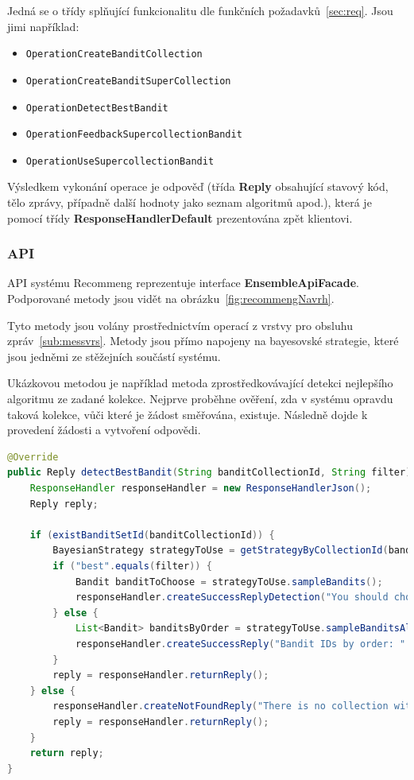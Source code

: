 \documentclass[thesis=M,czech]{FITthesis}[2014/05/07]
\begin{document}
Jedná se o třídy splňující funkcionalitu dle funkčních požadavků~\ref{sec:req}. Jsou jimi například:

\begin{itemize}
	\item \texttt{OperationCreateBanditCollection}
	\item \texttt{OperationCreateBanditSuperCollection}	
	\item \texttt{OperationDetectBestBandit}
	\item \texttt{OperationFeedbackSupercollectionBandit}
	\item \texttt{OperationUseSupercollectionBandit}			
\end{itemize}

Výsledkem vykonání operace je odpověď (třída \textbf{Reply} obsahující stavový kód, tělo zprávy, případně další hodnoty jako seznam algoritmů apod.), která je pomocí třídy \textbf{ResponseHandlerDefault} prezentována zpět klientovi.

\subsubsection{API}
API systému Recommeng reprezentuje interface \textbf{EnsembleApiFacade}. Podporované metody jsou vidět na obrázku~\ref{fig:recommengNavrh}.

Tyto metody jsou volány prostřednictvím operací z vrstvy pro obsluhu zpráv~\ref{sub:messvrs}. Metody jsou přímo napojeny na bayesovské strategie, které jsou jedněmi ze stěžejních součástí systému.

Ukázkovou metodou je například metoda zprostředkovávající detekci nejlepšího algoritmu ze zadané kolekce. Nejprve proběhne ověření, zda v systému opravdu taková kolekce, vůči které je žádost směřována, existuje. Následně dojde k provedení žádosti a vytvoření odpovědi.

\begin{lstlisting}[language=java]
@Override
public Reply detectBestBandit(String banditCollectionId, String filter) {
    ResponseHandler responseHandler = new ResponseHandlerJson();
    Reply reply;

    if (existBanditSetId(banditCollectionId)) {
        BayesianStrategy strategyToUse = getStrategyByCollectionId(banditCollectionId);
        if ("best".equals(filter)) {
            Bandit banditToChoose = strategyToUse.sampleBandits();            
            responseHandler.createSuccessReplyDetection("You should choose bandit with name " + banditToChoose.getName() + " now. He is the best for this context.", banditToChoose.getId(), banditToChoose.getName(), strategyToUse.getId());
        } else {
            List<Bandit> banditsByOrder = strategyToUse.sampleBanditsAll(banditCollectionId);
            responseHandler.createSuccessReply("Bandit IDs by order: " + banditsByOrder.toString());
        }
        reply = responseHandler.returnReply();
    } else {
        responseHandler.createNotFoundReply("There is no collection with ID " + banditCollectionId + " in application.");
        reply = responseHandler.returnReply();
    }
    return reply;
}
\end{lstlisting}
\end{document}
